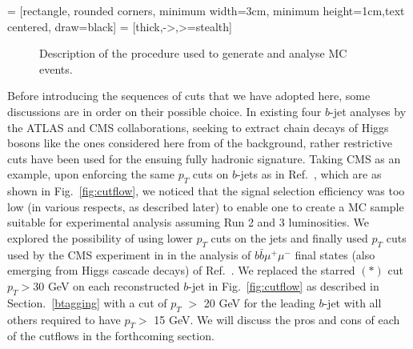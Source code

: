 \documentclass[12pt]{article}
\begin{document}
\vspace*{1em}
 = [rectangle, rounded corners, minimum width=3cm, minimum height=1cm,text centered, draw=black]
 = [thick,->,>=stealth]

\begin{figure}[htb!]
\centering
\hspace*{-0.5truecm}
\caption{Description of the procedure used to generate and analyse MC events. }
\label{fig:toolbox}
\end{figure}

Before introducing the sequences of cuts that we have adopted here,
some discussions are in order on their possible choice. In existing
four $b$-jet analyses by the ATLAS and CMS collaborations, seeking to
extract chain decays of Higgs bosons like the ones considered here
from of the background, rather restrictive cuts have been used for the
ensuing fully hadronic signature. Taking CMS as an example, upon
enforcing the same $p_T$ cuts on $b$-jets as in
Ref.~\cite{Sirunyan:2019jud}, which are as shown in
Fig.~\ref{fig:cutflow}, we noticed that the signal selection
efficiency was too low (in various respects, as described later) to
enable one to create a MC sample suitable for experimental analysis
assuming Run 2 and 3 luminosities. We explored the possibility of using
lower $p_T$ cuts on the jets and finally used $p_T$ cuts used by the
CMS experiment in  in the analysis of $b\bar
b\mu^+\mu^-$ final states (also emerging from Higgs cascade decays) of
Ref.~\cite{Sirunyan:2018mot}. We replaced the
starred $(*)$ cut $p_T>30$ GeV on each reconstructed $b$-jet in
Fig.~\ref{fig:cutflow} as described in Section.~\ref{btagging} with 
a cut of $p_T$ $>$ 20 GeV for the leading $b$-jet with all others 
required to have $p_T >$ 15 GeV. We will discuss the pros and cons of each of the
cutflows in the forthcoming section.
\end{document}
